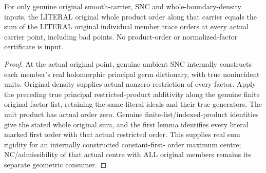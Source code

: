\begin{theorem}
\label{hir:sharp-original-member-product-whole-factor-order-sum}
\leanok
For only genuine original smooth-carrier, SNC and whole-boundary-density
inputs, the LITERAL original whole product order along that carrier
equals the sum of the LITERAL original individual member trace orders
at every actual carrier point, including bad points. No product-order
or normalized-factor certificate is input.
\end{theorem}
\begin{proof}
At the actual original point, genuine ambient SNC internally constructs
each member's real holomorphic principal germ dictionary, with true
nonincident units. Original density supplies actual nonzero restriction
of every factor. Apply the preceding true principal restricted-product
additivity along the genuine finite original factor list, retaining the
same literal ideals and their true generators. The unit product has
actual order zero. Genuine finite-list/indexed-product identities give
the stated whole original sum, and the first lemma identifies every
literal marked first order with that actual restricted order. This
supplies real sum rigidity for an internally constructed constant-first-
order maximum centre; NC/admissibility of that actual centre with ALL
original members remains its separate geometric consumer.
\end{proof}
